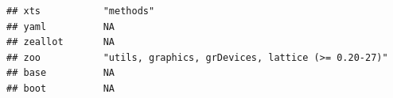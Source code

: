 \documentclass[]{article}
\begin{document}
\begin{verbatim}
## xts           "methods"                                                                                                                                                                                                                                                                                                                                                                                                                                                                             
## yaml          NA                                                                                                                                                                                                                                                                                                                                                                                                                                                                                    
## zeallot       NA                                                                                                                                                                                                                                                                                                                                                                                                                                                                                    
## zoo           "utils, graphics, grDevices, lattice (>= 0.20-27)"                                                                                                                                                                                                                                                                                                                                                                                                                                    
## base          NA                                                                                                                                                                                                                                                                                                                                                                                                                                                                                    
## boot          NA                                                                                                                                                                                                                                                                                                                                                                                                                                                                                    

\end{verbatim}
\end{document}
